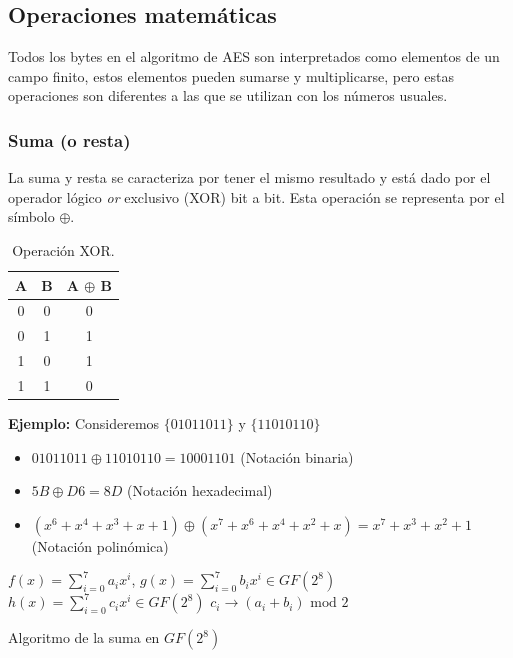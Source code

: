 \documentclass[peerreview]{IEEEtran}
\begin{document}
\subsection{Operaciones matemáticas}
Todos los bytes en el algoritmo de AES son interpretados como elementos de un campo finito, estos elementos pueden sumarse y multiplicarse, pero estas operaciones son diferentes a las que se utilizan con los números usuales.
\bigbreak
\subsubsection{Suma (o resta)}
La suma y resta se caracteriza por tener el mismo resultado y está dado por el operador lógico \textit{or} exclusivo (XOR) bit a bit. Esta operación se representa por el símbolo $\oplus$.

\begin{table}[h]
\centering
\begin{tabular}{|c|c|c|}
\hline
A & B & A $\oplus$ B \\ \hline
0 & 0 & 0         \\ \hline
0 & 1 & 1         \\ \hline
1 & 0 & 1         \\ \hline
1 & 1 & 0         \\ \hline
\end{tabular}
\caption{\label{tab:XOR}Operación XOR.}
\end{table}
\textbf{Ejemplo:}
Consideremos $\{0101 1011\}$ y $\{1101 0110\}$
\begin{itemize}
    \item $01011011 \oplus 11010110=10001101$ (Notación binaria)
    
    \item $5B\oplus D6=8D$ (Notación hexadecimal)
    
    \item $(x^6 +x^4 +x^3 +x+1)\oplus (x^7 + x^6 + x^4 + x^2 +x)=x^7 + x^3 + x^2 +1$ (Notación polinómica)
\end{itemize}

\begin{algorithm}
\begin{algorithmic}[1]
  \REQUIRE $f(x)=\sum_{i=0}^{7}a_{i}x^{i}$, $g(x)=\sum_{i=0}^{7}b_{i}x^{i} \in GF(2^8)$
  \ENSURE  $h(x)=\sum_{i=0}^{7}c_{i}x^i \in GF(2^8)$
  \STATE $c_i  \to (a_i + b_i) \text{ mod } 2$
  \ENDFOR
\end{algorithmic} 
  
  \caption{Algoritmo de la suma en $GF(2^8)$}
  \label{a1}
\end{algorithm}
\end{document}
